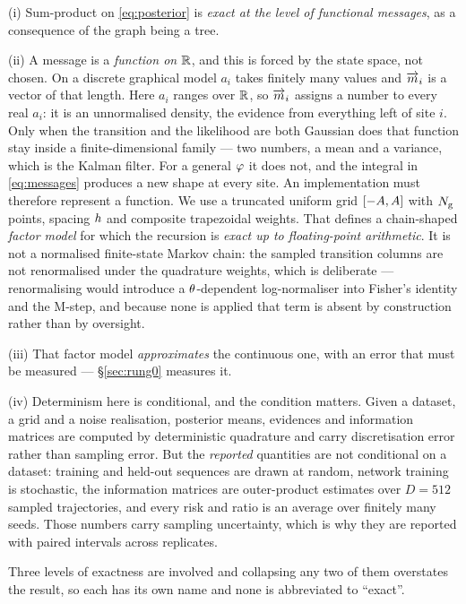 (i) Sum-product on \eqref{eq:posterior} is \emph{exact at the level of functional messages}, as a
consequence of the graph being a tree.

(ii) A message is a \emph{function on $\mathbb{R}$}, and this is forced by the state space, not chosen.
On a discrete graphical model $a_i$ takes finitely many values and $\overrightarrow{m}_i$ is a vector of that
length. Here $a_i$ ranges over $\mathbb{R}$, so $\overrightarrow{m}_i$ assigns a number to every real $a_i$: it is
an unnormalised density, the evidence from everything left of site $i$. Only when the transition
and the likelihood are both Gaussian does that function stay inside a finite-dimensional family
--- two numbers, a mean and a variance, which is the Kalman filter. For a general $\varphi$ it does
not, and the integral in \eqref{eq:messages} produces a new shape at every site. An implementation
must therefore represent a function. We use a truncated uniform grid
$[-A,A]$ with $N_{\mathrm{g}}$ points, spacing $h$ and composite trapezoidal
weights. That defines a chain-shaped \emph{factor model} for which the recursion is \emph{exact
up to floating-point arithmetic}. It is not a normalised finite-state Markov chain: the sampled
transition columns are not renormalised under the quadrature weights, which is deliberate ---
renormalising would introduce a $\theta$-dependent log-normaliser into Fisher's identity and the
M-step, and because none is applied that term is absent by construction rather than by oversight.

(iii) That factor model \emph{approximates} the continuous one, with an error that must be
measured --- \S\ref{sec:rung0} measures it.

(iv) Determinism here is conditional, and the condition matters. Given a dataset, a grid and a
noise realisation, posterior means, evidences and information matrices are computed by
deterministic quadrature and carry discretisation error rather than sampling error. But the
\emph{reported} quantities are not conditional on a dataset: training and held-out sequences are
drawn at random, network training is stochastic, the information matrices are outer-product
estimates over $D=512$ sampled trajectories, and every risk and ratio is an average over finitely
many seeds. Those numbers carry sampling uncertainty, which is why they are reported with paired
intervals across replicates.

Three levels of exactness are involved and collapsing any two of them overstates the result, so
each has its own name and none is abbreviated to ``exact''.

